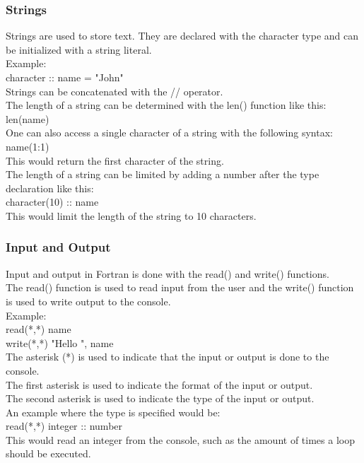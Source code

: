 \documentclass[12pt,a4paper]{scrartcl}
\begin{document}
\subsubsection{Strings}
Strings are used to store text. They are declared with the character type and can be initialized with a string literal.\\
Example:\\
character :: name = "John"\\
Strings can be concatenated with the // operator.\\
The length of a string can be determined with the len() function like this:\\
len(name)\\
One can also access a single character of a string with the following syntax:\\
name(1:1)\\
This would return the first character of the string.\\
The length of a string can be limited by adding a number after the type declaration like this:\\
character(10) :: name\\
This would limit the length of the string to 10 characters.\\

\subsubsection{Input and Output} %
Input and output in Fortran is done with the read() and write() functions.\\
The read() function is used to read input from the user and the write() function is used to write output to the console.\\
Example:\\
read(*,*) name\\
write(*,*) "Hello ", name\\
The asterisk (*) is used to indicate that the input or output is done to the console.\\
The first asterisk is used to indicate the format of the input or output.\\
The second asterisk is used to indicate the type of the input or output.\\
An example where the type is specified would be:\\
read(*,*) integer :: number\\
This would read an integer from the console, such as the amount of times a loop should be executed.\\
\end{document}
